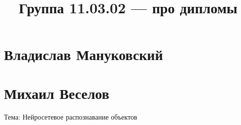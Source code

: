 \documentclass{article}
\title{Группа 11.03.02 --- про дипломы}
\begin{document}
\section*{Владислав Мануковский}

\section*{Михаил Веселов}
Тема: Нейросетевое распознавание объектов
\end{document}
